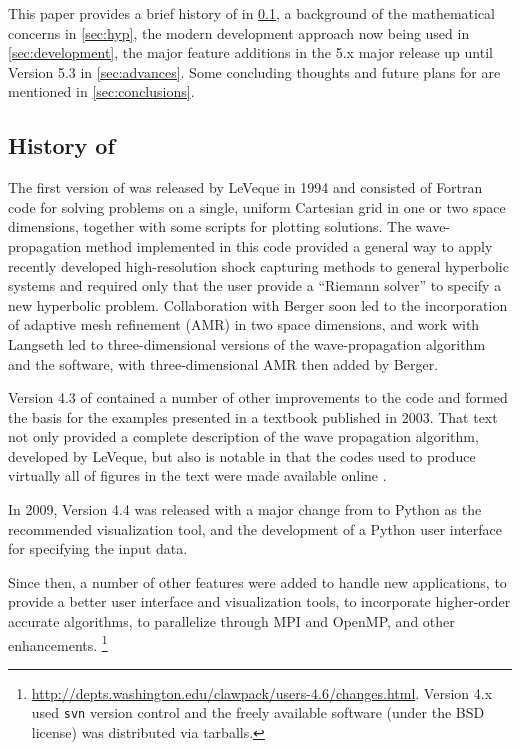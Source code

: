 This paper provides a brief history of \clawpack in
\cref{sub:history}, a background of the mathematical concerns in \cref{sec:hyp},
the modern development approach now being used in \cref{sec:development},
the major feature additions in the \clawpack 5.x major release up until Version 5.3 in
\cref{sec:advances}. Some concluding thoughts and future plans for
\clawpack are mentioned in
\cref{sec:conclusions}.

\subsection{History of \clawpack} \label{sub:history}

The first version of \clawpack was released by LeVeque in 1994
\cite{clawpack-v1} and consisted of Fortran code for solving problems on a
single, uniform Cartesian
grid in one or two space dimensions, together with some \mlab
\cite{MATLAB:2015a} scripts
for plotting solutions. The wave-propagation method implemented
in this code provided a general way to apply recently developed
high-resolution shock capturing methods to general hyperbolic systems and
required only that the user provide a ``Riemann solver'' to specify a new
hyperbolic problem.
Collaboration with Berger \cite{mjb-rjl:amrclaw}
soon led to the incorporation of adaptive mesh refinement (AMR) in two space
dimensions, and work with Langseth \cite{jol-rjl:3d, jol:thesis}
led to three-dimensional versions of the wave-propagation algorithm and the
software, with three-dimensional AMR then added by Berger.

Version 4.3 of \clawpack contained a number of other improvements to
the code and formed the basis for the examples presented in a textbook
\cite{rjl:fvmhp} published in 2003.  That text not only provided a
complete description of the wave propagation algorithm, developed by LeVeque,
but also is notable in that the codes used to produce virtually all of figures
in the text were made available online \cite{rjl:fvmhp}.

In 2009, \clawpack Version 4.4 was released with a major change from \mlab
to Python as the recommended visualization tool, and the development
of a Python user interface for specifying the input data.

Since then, a number of other features were added to handle new applications, to
provide a better user interface and visualization tools, to incorporate
higher-order accurate algorithms, to parallelize through MPI and OpenMP, and
other enhancements. \footnote{\url{http://depts.washington.edu/clawpack/users-4.6/changes.html}.  Version
4.x used \texttt{svn} version control and the freely available software (under
the BSD license) was distributed via tarballs.}

